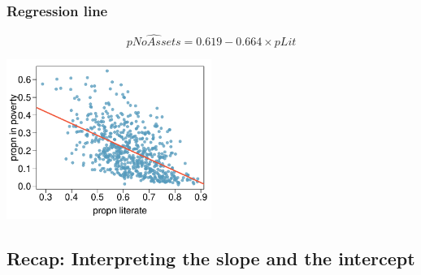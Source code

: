\documentclass[notes,11pt, aspectratio=169]{beamer}
\begin{document}

\begin{frame}
\frametitle{Regression line}

\[ \widehat{pNoAssets} = 0.619 - 0.664\times pLit \]

\begin{center}
\includegraphics[width=0.5\textwidth]{graphs/l08f05}
\end{center}

\end{frame}


\subsection{Recap: Interpreting the slope and the intercept}

\end{document}
